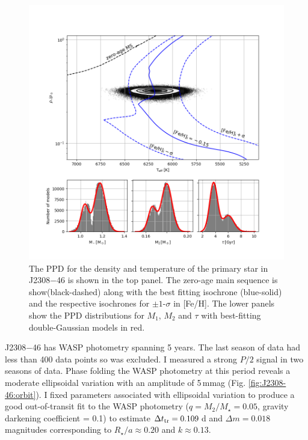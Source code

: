 \begin{figure}[htb]
    \centering
    \includegraphics[scale=0.7]{8-Results/J2308-46/HR.png}
    \caption{The PPD for the density and temperature of the primary star in J2308$-$46 is shown in the top panel. The zero-age main sequence is show(black-dashed) along with the best fitting isochrone (blue-solid) and the respective isochrones for $\pm 1$-$\sigma$ in [Fe/H]. The lower panels show the PPD distributions for $M_1$, $M_2$ and $\tau$ with best-fitting double-Gaussian models in red. }
    \label{fig:J2308-46:HR}
\end{figure}

J2308$-$46 has WASP photometry spanning 5 years. The last season of data had less than 400 data points so was excluded. I measured a strong $P/2$ signal in two seasons of data. Phase folding the WASP photometry at this period reveals a moderate ellipsoidal variation with an amplitude of 5\,mmag (Fig. \ref{fig:J2308-46:orbit}). I fixed parameters associated with ellipsoidal variation to produce a good out-of-transit fit to the WASP photometry ($q = M_{2}/M_{\star}=0.05$, gravity darkening coefficient = 0.1) to estimate $\Delta t_{\rm tr} = 0.109$\,d and $\Delta m = 0.018$\,magnitudes corresponding to $R_\star / a \approx 0.20$ and $k\approx0.13$.

